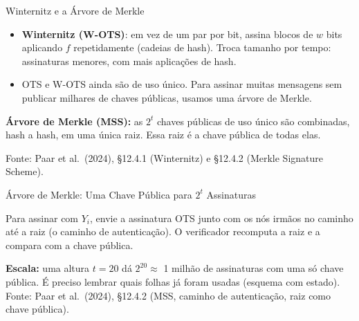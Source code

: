 \documentclass{beamer}
\begin{document}
\begin{frame}{Winternitz e a Árvore de Merkle}
    \begin{itemize}
        \footnotesize
        \item \textbf{Winternitz (W-OTS)}: em vez de um par por bit, assina blocos de $w$ bits aplicando $f$ repetidamente (cadeias de hash). Troca tamanho por tempo: assinaturas menores, com mais aplicações de hash.
        \item OTS e W-OTS ainda são de uso único. Para assinar muitas mensagens sem publicar milhares de chaves públicas, usamos uma árvore de Merkle.
    \end{itemize}
    \medskip
    \begin{tcolorbox}[colback=gray!8,colframe=gray!60!black,boxrule=0.5pt]
        \footnotesize
        \textbf{Árvore de Merkle (MSS):} as $2^{t}$ chaves públicas de uso único são combinadas, hash a hash, em uma única raiz. Essa raiz é a chave pública de todas elas.
    \end{tcolorbox}
    \smallskip
    {\tiny Fonte: Paar et al.\ (2024), §12.4.1 (Winternitz) e §12.4.2 (Merkle Signature Scheme).}
\end{frame}

\begin{frame}{Árvore de Merkle: Uma Chave Pública para $2^t$ Assinaturas}
    \begin{center}
    \end{center}
    \vspace{-0.3em}
    \begin{tcolorbox}[colback=green!6,colframe=green!50!black,boxrule=0.5pt]
        \footnotesize
        Para assinar com $Y_i$, envie a assinatura OTS junto com os nós irmãos no caminho até a raiz (o caminho de autenticação). O verificador recomputa a raiz e a compara com a chave pública.
    \end{tcolorbox}
    \vspace{-0.1em}
    {\footnotesize \textbf{Escala:} uma altura $t=20$ dá $2^{20} \approx$ 1 milhão de assinaturas com uma só chave pública. É preciso lembrar quais folhas já foram usadas (esquema com estado).}
    \smallskip
    {\tiny Fonte: Paar et al.\ (2024), §12.4.2 (MSS, caminho de autenticação, raiz como chave pública).}
\end{frame}
\end{document}
